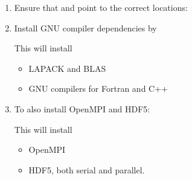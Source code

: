 \documentclass[letterpaper,10pt,english]{sphinxmanual}
\begin{document}
\begin{enumerate}
%
\item {} 
\sphinxAtStartPar
Ensure that  and  point to the correct locations:

\begin{sphinxVerbatim}[commandchars=\\\{\},formatcom=\scriptsize]
 
 
\end{sphinxVerbatim}

\item {} 
\sphinxAtStartPar
Install GNU compiler dependencies by

\begin{sphinxVerbatim}[commandchars=\\\{\},formatcom=\scriptsize]
       
\end{sphinxVerbatim}

\sphinxAtStartPar
This will install
\begin{itemize}
\item {} 
\sphinxAtStartPar
LAPACK and BLAS

\item {} 
\sphinxAtStartPar
GNU compilers for Fortran and C++

\end{itemize}

\item {} 
\sphinxAtStartPar
To also install OpenMPI and HDF5:

\begin{sphinxVerbatim}[commandchars=\\\{\},formatcom=\scriptsize]
     
\end{sphinxVerbatim}

\sphinxAtStartPar
This will install
\begin{itemize}
\item {} 
\sphinxAtStartPar
OpenMPI

\item {} 
\sphinxAtStartPar
HDF5, both serial and parallel.


\end{itemize}
\end{enumerate}
\end{document}
